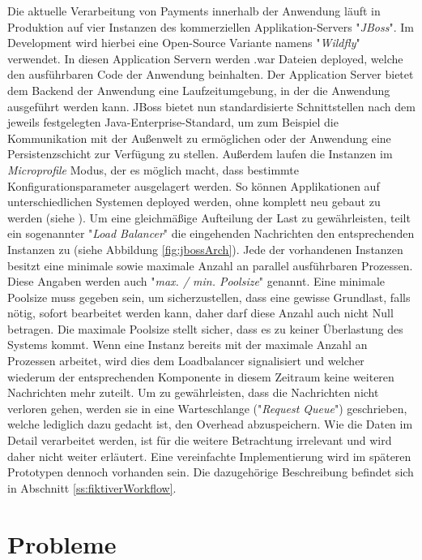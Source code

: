 Die aktuelle Verarbeitung von Payments innerhalb der Anwendung läuft in Produktion auf vier Instanzen des kommerziellen Applikation-Servers "\emph{JBoss}". Im Development wird hierbei eine Open-Source Variante namens "\emph{Wildfly}" verwendet. In diesen Application Servern werden .war Dateien deployed, welche den ausführbaren Code der Anwendung beinhalten. Der Application Server bietet dem Backend der Anwendung eine Laufzeitumgebung, in der die Anwendung ausgeführt werden kann. JBoss bietet nun standardisierte Schnittstellen nach dem jeweils festgelegten Java-Enterprise-Standard, um zum Beispiel die Kommunikation mit der Außenwelt zu ermöglichen oder der Anwendung eine Persistenzschicht zur Verfügung zu stellen. Außerdem laufen die Instanzen im \emph{Microprofile} Modus, der es möglich macht, dass bestimmte Konfigurationsparameter ausgelagert werden. So können Applikationen auf unterschiedlichen Systemen deployed werden, ohne komplett neu gebaut zu werden (siehe \cite{microprofile}). Um eine gleichmäßige Aufteilung der Last zu gewährleisten, teilt ein sogenannter "\emph{Load Balancer}" die eingehenden Nachrichten den entsprechenden Instanzen zu (siehe Abbildung \ref{fig:jbossArch}). Jede der vorhandenen Instanzen besitzt eine minimale sowie maximale Anzahl an parallel ausführbaren Prozessen. Diese Angaben werden auch "\emph{max. / min. Poolsize}" genannt. Eine minimale Poolsize muss gegeben sein, um sicherzustellen, dass eine gewisse Grundlast, falls nötig, sofort bearbeitet werden kann, daher darf diese Anzahl auch nicht Null betragen. Die maximale Poolsize stellt sicher, dass es zu keiner Überlastung des Systems kommt. Wenn eine Instanz bereits mit der maximale Anzahl an Prozessen arbeitet, wird dies dem Loadbalancer signalisiert und welcher wiederum der entsprechenden Komponente in diesem Zeitraum keine weiteren Nachrichten mehr zuteilt. Um zu gewährleisten, dass die Nachrichten nicht verloren gehen, werden sie in eine Warteschlange ("\emph{Request Queue}") geschrieben, welche lediglich dazu gedacht ist, den Overhead abzuspeichern. Wie die Daten im Detail verarbeitet werden, ist für die weitere Betrachtung irrelevant und wird daher nicht weiter erläutert. Eine vereinfachte Implementierung wird im späteren Prototypen dennoch vorhanden sein. Die dazugehörige Beschreibung befindet sich in Abschnitt \ref{ss:fiktiverWorkflow}.


\section{Probleme \checkmark}

